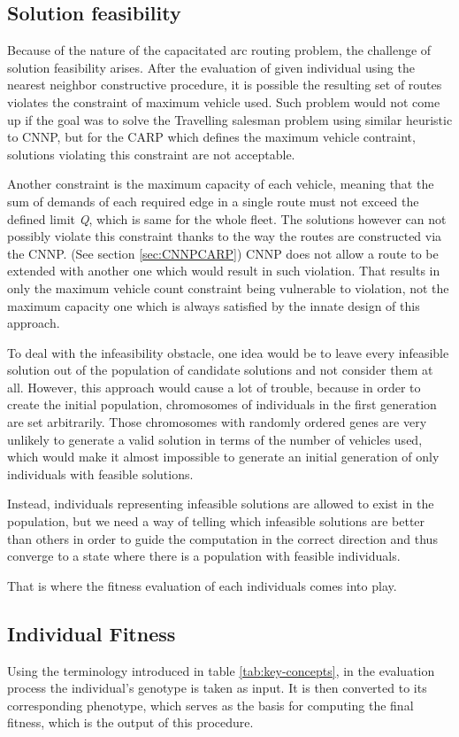 \documentclass[twoside]{ctuthesis}
\theoremstyle{plain}
\theoremstyle{definition}
\theoremstyle{note}
\begin{document}
 

\subsection{Solution feasibility}
\label{sec:feasibility}
Because of the nature of the capacitated arc routing problem, the challenge of solution feasibility arises. After the evaluation of given individual using the nearest neighbor constructive procedure, it is possible the resulting set of routes violates the constraint of maximum vehicle used. Such problem would not come up if the goal was to solve the Travelling salesman problem using similar heuristic to CNNP, but for the CARP which defines the maximum vehicle contraint, solutions violating this constraint are not acceptable. 

Another constraint is the maximum capacity of each vehicle, meaning that the sum of demands of each required edge in a single route must not exceed the defined limit \emph{Q}, which is same for the whole fleet. The solutions however can not possibly violate this constraint thanks to the way the routes are constructed via the CNNP. (See section \ref{sec:CNNPCARP}) CNNP does not allow a route to be extended with another one which would result in such violation. That results in only the maximum vehicle count constraint being vulnerable to violation, not the maximum capacity one which is always satisfied by the innate design of this approach.

To deal with the infeasibility obstacle, one idea would be to leave every infeasible solution out of the population of candidate solutions and not consider them at all. However, this approach would cause a lot of trouble, because in order to create the initial population, chromosomes of individuals in the first generation are set arbitrarily. Those chromosomes with randomly ordered genes are very unlikely to generate a valid solution in terms of the number of vehicles used, which would make it almost impossible to generate an initial generation of only individuals with feasible solutions.

Instead, individuals representing infeasible solutions are allowed to exist in the population, but we need a way of telling which infeasible solutions are better than others in order to guide the computation in the correct direction and thus converge to a state where there is a population with feasible individuals. 

That is where the fitness evaluation of each individuals comes into play.

\subsection{Individual Fitness}
\label{sec:fitness}
Using the terminology introduced in table \ref{tab:key-concepts}, in the evaluation process the individual's genotype is taken as input. It is then converted to its corresponding phenotype, which serves as the basis for computing the final fitness, which is the output of this procedure.
\end{document}
